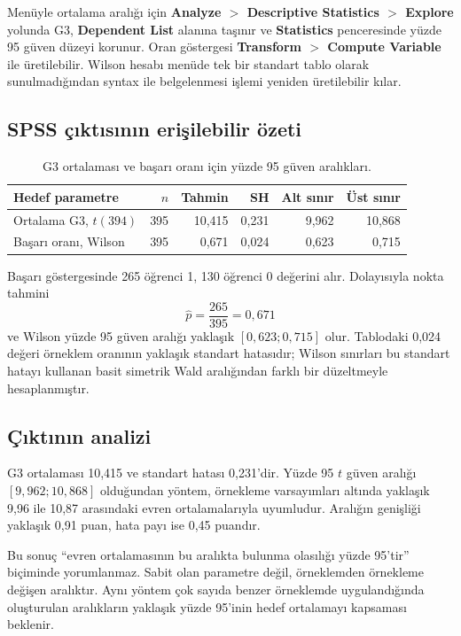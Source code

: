 Menüyle ortalama aralığı için \textbf{Analyze $>$ Descriptive Statistics $>$
Explore} yolunda G3, \textbf{Dependent List} alanına taşınır ve
\textbf{Statistics} penceresinde yüzde 95 güven düzeyi korunur. Oran göstergesi
\textbf{Transform $>$ Compute Variable} ile üretilebilir. Wilson hesabı menüde
tek bir standart tablo olarak sunulmadığından syntax ile belgelenmesi işlemi
yeniden üretilebilir kılar.

\subsection{SPSS çıktısının erişilebilir özeti}

\begin{table}[htbp]
\centering
\caption{G3 ortalaması ve başarı oranı için yüzde 95 güven aralıkları.}
\begin{tabular}{@{}p{}rrrrr@{}}
\toprule
Hedef parametre & $n$ & Tahmin & SH & Alt sınır & Üst sınır \\
\midrule
Ortalama G3, $t(394)$ & 395 & 10,415 & 0,231 & 9,962 & 10,868 \\
Başarı oranı, Wilson & 395 & 0,671 & 0,024 & 0,623 & 0,715 \\
\bottomrule
\end{tabular}
\end{table}

Başarı göstergesinde 265 öğrenci 1, 130 öğrenci 0 değerini alır. Dolayısıyla
nokta tahmini
\[
\hat p=\frac{265}{395}=0{,}671
\]
ve Wilson yüzde 95 güven aralığı yaklaşık $[0{,}623;0{,}715]$ olur. Tablodaki
0,024 değeri örneklem oranının yaklaşık standart hatasıdır; Wilson sınırları
bu standart hatayı kullanan basit simetrik Wald aralığından farklı bir
düzeltmeyle hesaplanmıştır.

\subsection{Çıktının analizi}

G3 ortalaması 10,415 ve standart hatası 0,231'dir. Yüzde 95 $t$ güven aralığı
$[9{,}962;10{,}868]$ olduğundan yöntem, örnekleme varsayımları altında yaklaşık
9,96 ile 10,87 arasındaki evren ortalamalarıyla uyumludur. Aralığın genişliği
yaklaşık 0,91 puan, hata payı ise 0,45 puandır.

Bu sonuç ``evren ortalamasının bu aralıkta bulunma olasılığı yüzde 95'tir''
biçiminde yorumlanmaz. Sabit olan parametre değil, örneklemden örnekleme
değişen aralıktır. Aynı yöntem çok sayıda benzer örneklemde uygulandığında
oluşturulan aralıkların yaklaşık yüzde 95'inin hedef ortalamayı kapsaması
beklenir.

